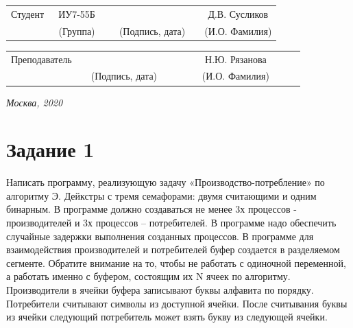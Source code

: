 \documentclass[14pt, a4paper]{extarticle}
\begin{document}
	
	\noindent
	\\
	
	\noindent
	\\
	
	\vspace{1.5cm}
	\noindent
	\begin{tabular}{l c c c c c}
		Студент      & ~ИУ7-55Б~               & \hspace{2.5cm} & \hspace{2cm}                 & &  Д.В. 
		Сусликов \\\cline{2-2}\cline{4-4} \cline{6-6} 
		\hspace{3cm} & {\footnotesize(Группа)} &                & {\footnotesize(Подпись, дата)} & & {\footnotesize(И.О. Фамилия)}
	\end{tabular}
	
	\noindent
	\begin{tabular}{l c c c c}
		Преподаватель & \hspace{5cm}   & \hspace{2cm}                 & & ~~~~~~Н.Ю. Рязанова~~~~~~\\\cline{3-3} \cline{5-5} 
		\hspace{3cm}  &                & {\footnotesize(Подпись, дата)} & & {\footnotesize(И.О. Фамилия)}
	\end{tabular}
	
	\vspace{0.6cm}
	\begin{center}	
		\vfill
		\large \textit {Москва, 2020}
	\end{center}
	
	\thispagestyle {empty}
	\pagebreak
	
	\clearpage
	\tableofcontents
	
	
	\clearpage
	\section*{Задание 1}
	Написать программу, реализующую задачу «Производство-потребление» по алгоритму Э. Дейкстры с тремя семафорами: двумя считающими и одним бинарным. В программе должно создаваться не менее 3х процессов - производителей и 3х процессов – потребителей. В программе надо обеспечить случайные задержки выполнения созданных процессов. В программе для взаимодействия производителей и потребителей буфер создается в разделяемом сегменте. Обратите внимание на то, чтобы не работать с одиночной переменной, а работать именно с буфером, состоящим их N ячеек по алгоритму. Производители в ячейки буфера записывают буквы алфавита по порядку. Потребители считывают символы из доступной ячейки. После считывания буквы из ячейки следующий потребитель может взять букву из следующей ячейки. \par
	
\end{document}
